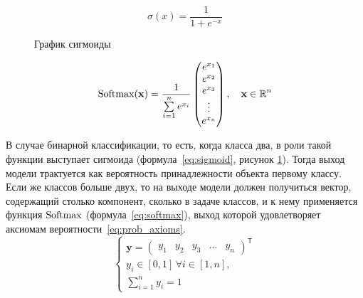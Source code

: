 \begin{equation}
    \label{eq:sigmoid}
    \sigma(x)=\frac{1}{1+e^{-x}}
\end{equation}

\begin{figure}[h]
    \centering
    \caption{График сигмоиды}
    \label{fig:sigmoid}
\end{figure}

\begin{equation}
    \label{eq:softmax}
    \operatorname{Softmax}(\mathbf{x})=\frac{1}{\sum\limits_{i=1}^n e^{x_i}}
    \left(\begin{matrix}
        e^{x_1} \\
        e^{x_2} \\
        e^{x_3} \\
        \vdots \\
        e^{x_n}
    \end{matrix}\right),\quad \mathbf{x}\in \operatorname{\mathbb{R}}^n
\end{equation}

В случае бинарной классификации, то есть, когда класса два, в роли такой функции выступает сигмоида (формула \ref*{eq:sigmoid}, рисунок \ref*{fig:sigmoid}). Тогда выход модели трактуется как вероятность принадлежности объекта первому классу. Если же классов больше двух, то на выходе модели должен получиться вектор, содержащий столько компонент, сколько в задаче классов, и к нему применяется функция $\operatorname{Softmax}$ (формула \ref*{eq:softmax}), выход которой удовлетворяет аксиомам вероятности \ref*{eq:prob_axioms}.
\begin{equation}
    \label{eq:prob_axioms}
    \begin{cases}
        \mathbf{y}=\left(\begin{matrix}
            y_1 & y_2 & y_3 & \dots & y_n
        \end{matrix}\right)^\mathsf{T} \\
        y_i \in [0, 1]\,\forall i\in[1, n], \\
        \sum\limits_{i=1}^n y_i = 1
    \end{cases}
\end{equation}

